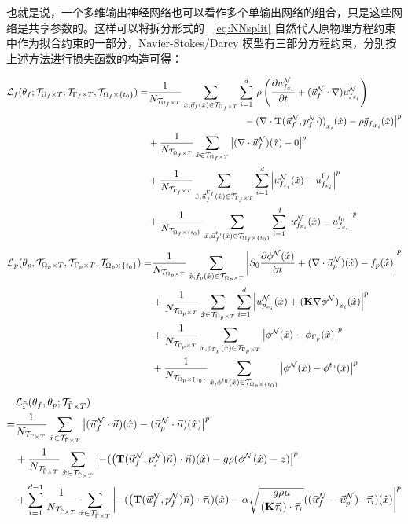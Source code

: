 也就是说，一个多维输出神经网络也可以看作多个单输出网络的组合，只是这些网络是共享参数的。这样可以将拆分形式的 ~\eqref{eq:NNsplit} 自然代入原物理方程约束中作为拟合约束的一部分，Navier-Stokes/Darcy 模型有三部分方程约束，分别按上述方法进行损失函数的构造可得：

\begin{equation}\label{eq:Lossf}
\begin{aligned}
    \Lossf
    =& \toscaLossPre{\TDf}{\x,\gf(\x)}
    \sum_{i=1}^{d}
    \bigl\vert
        \rho \left(
                \toD{\NUfi}{t} + (\NUf \cdot \gradOp) \NUfi 
            \right) \\
    & \hspace*{10em} - \compx{(\gradOp \cdot \opT{\NUf}{\Npf{\cdot}})} - \rho \compx{\gf}
    \bigr\vert^{p} \\
    &+
    \toscaLoss{\TDf}{\x}{
        (\gradOp \cdot \NUf)(\x) - 0
    } \\
    &+
    \toLoss{\TBDf}{\x,\Uf^{\Bf}(\x)}{d}{
        \NUfi(\x) - u^{\Bf}_{f_{x_i}}
    } \\
    &+
    \toLoss{\TIDf}{\x,\Uf^{t_0}(\x)}{d}{
        \NUfi(\x) - u^{t_0}_{f_{x_i}}
    } 
\end{aligned}
\end{equation}
\begin{equation}\label{eq:Lossp}
\begin{aligned}
    \Lossp
    =& \toscaLoss{\TDp}{\x,\fp(\x)}{
        S_{0}\toD{\Npp(\x)}{t} + (\gradOp \cdot \NUp)(\x) - \fp(\x)
    } \\
    &+
    \toLoss{\TDp}{\x}{d}{
        \NUpi(\x) + \compx{(\matfmt{K} \gradOp \Npp)}
    } \\
    &+
    \toscaLoss{\TBDp}{\x,{\pp_{\Bp}}(\x)}{
        \Npp(\x) - \pp_{\Bp}(\x)
    } \\
    &+
    \toscaLoss{\TIDp}{\x,\pp^{t_0}(\x)}{
        \Npp(\x) - \pp^{t_0}(\x)
    }
\end{aligned}
\end{equation}
\begin{equation}\label{eq:Lossi}
\begin{aligned}
    &\Lossi \\
    =& \toscaLoss{\TiBD}{\x}{
        (\NUf \cdot \vec{n})(\x) - (\NUp \cdot \vec{n})(\x)
    } \\
    &+
    \toscaLoss{\TiBD}{\x}{
        -(\left(\opT{\NUf}{\Npf} \vec{n} \right) \cdot \vec{n})(\x) - g \rho (\Npp(\x) - z)
    } \\
    &+
    \sum_{i=1}^{d-1} \toscaLoss{\TiBD}{\x}{
        -(\left(\opT{\NUf}{\Npf} \vec{n} \right) \cdot \vec{\tau}_i)(\x) - \alpha \sqrt{\frac{g \rho \mu}{(\matfmt{K} \vec{\tau}_i) \cdot \vec{\tau}_i}} ((\NUf - \NUp) \cdot \vec{\tau}_i)(\x)
    }
\end{aligned} 
\end{equation}

